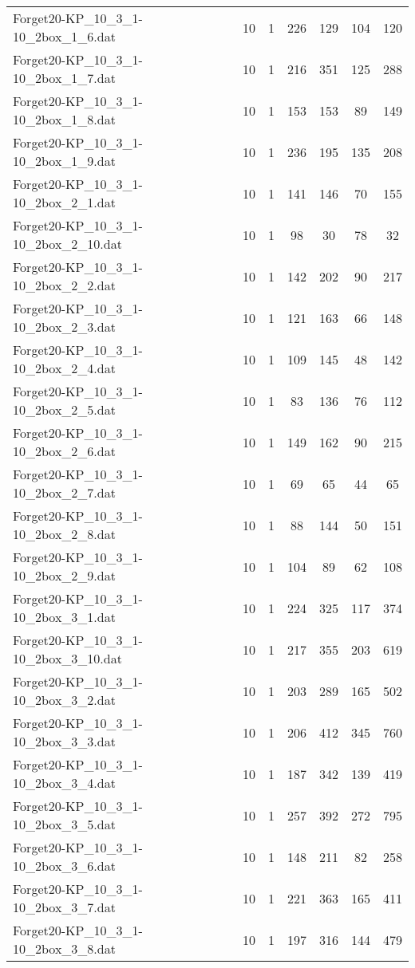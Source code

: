 \begin{table}[!ht]
\begin{tabular}{lcccccc}
Forget20-KP\_10\_3\_1-10\_2box\_1\_6.dat & 10 & 1 & 226 & 129 & 104 & 120 \\
Forget20-KP\_10\_3\_1-10\_2box\_1\_7.dat & 10 & 1 & 216 & 351 & 125 & 288 \\
Forget20-KP\_10\_3\_1-10\_2box\_1\_8.dat & 10 & 1 & 153 & 153 & 89 & 149 \\
Forget20-KP\_10\_3\_1-10\_2box\_1\_9.dat & 10 & 1 & 236 & 195 & 135 & 208 \\
Forget20-KP\_10\_3\_1-10\_2box\_2\_1.dat & 10 & 1 & 141 & 146 & 70 & 155 \\
Forget20-KP\_10\_3\_1-10\_2box\_2\_10.dat & 10 & 1 & 98 & 30 & 78 & 32 \\
Forget20-KP\_10\_3\_1-10\_2box\_2\_2.dat & 10 & 1 & 142 & 202 & 90 & 217 \\
Forget20-KP\_10\_3\_1-10\_2box\_2\_3.dat & 10 & 1 & 121 & 163 & 66 & 148 \\
Forget20-KP\_10\_3\_1-10\_2box\_2\_4.dat & 10 & 1 & 109 & 145 & 48 & 142 \\
Forget20-KP\_10\_3\_1-10\_2box\_2\_5.dat & 10 & 1 & 83 & 136 & 76 & 112 \\
Forget20-KP\_10\_3\_1-10\_2box\_2\_6.dat & 10 & 1 & 149 & 162 & 90 & 215 \\
Forget20-KP\_10\_3\_1-10\_2box\_2\_7.dat & 10 & 1 & 69 & 65 & 44 & 65 \\
Forget20-KP\_10\_3\_1-10\_2box\_2\_8.dat & 10 & 1 & 88 & 144 & 50 & 151 \\
Forget20-KP\_10\_3\_1-10\_2box\_2\_9.dat & 10 & 1 & 104 & 89 & 62 & 108 \\
Forget20-KP\_10\_3\_1-10\_2box\_3\_1.dat & 10 & 1 & 224 & 325 & 117 & 374 \\
Forget20-KP\_10\_3\_1-10\_2box\_3\_10.dat & 10 & 1 & 217 & 355 & 203 & 619 \\
Forget20-KP\_10\_3\_1-10\_2box\_3\_2.dat & 10 & 1 & 203 & 289 & 165 & 502 \\
Forget20-KP\_10\_3\_1-10\_2box\_3\_3.dat & 10 & 1 & 206 & 412 & 345 & 760 \\
Forget20-KP\_10\_3\_1-10\_2box\_3\_4.dat & 10 & 1 & 187 & 342 & 139 & 419 \\
Forget20-KP\_10\_3\_1-10\_2box\_3\_5.dat & 10 & 1 & 257 & 392 & 272 & 795 \\
Forget20-KP\_10\_3\_1-10\_2box\_3\_6.dat & 10 & 1 & 148 & 211 & 82 & 258 \\
Forget20-KP\_10\_3\_1-10\_2box\_3\_7.dat & 10 & 1 & 221 & 363 & 165 & 411 \\
Forget20-KP\_10\_3\_1-10\_2box\_3\_8.dat & 10 & 1 & 197 & 316 & 144 & 479 \\

\end{tabular}
\end{table}
